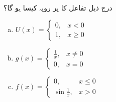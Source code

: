  \\ 
درج ذیل تفاعل کا  پر رویہ کیسا ہو گا؟
\begin{enumerate}[a.]
\item
$U(x)=\begin{cases}0,&x<0\\ 1,&x\ge 0  \end{cases}$
\item
$g(x)=\begin{cases} \tfrac{1}{x},&x\ne 0\\ 0,&x=0 \end{cases}$
\item
$f(x)=\begin{cases}0,&x\le 0\\ \sin \tfrac{1}{x},&x>0  \end{cases}$
\end{enumerate}
%

